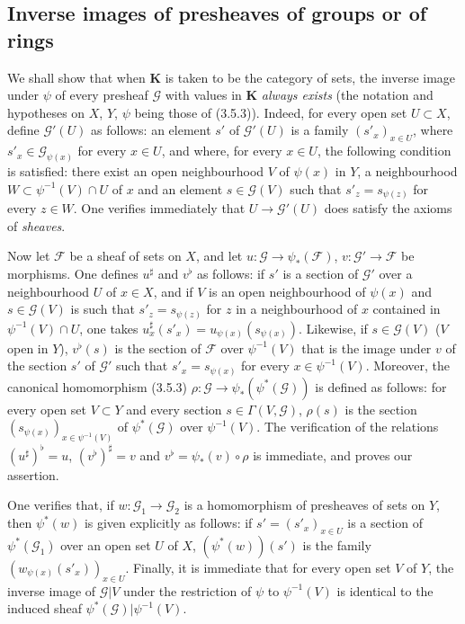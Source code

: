 \subsection{Inverse images of presheaves of groups or of rings}


\begin{env}[3.7.1]
\label{0.3.7.1}
We shall show that when $\boldsymbol{K}$ is taken to be the category of
sets, the inverse image under $\psi$ of every presheaf $\mathcal{G}$ with
values in $\boldsymbol{K}$ \emph{always exists} (the notation and hypotheses
on $X$, $Y$, $\psi$ being those of (3.5.3)). Indeed, for every open set
$U\subset X$, define $\mathcal{G}'(U)$ as follows: an element $s'$ of
$\mathcal{G}'(U)$ is a family $(s'_x)_{x\in U}$, where
$s'_x\in\mathcal{G}_{\psi(x)}$ for every $x\in U$, and where, for every $x\in U$,
the following condition is satisfied: there exist an open neighbourhood $V$ of
$\psi(x)$ in $Y$, a neighbourhood $W\subset\psi^{-1}(V)\cap U$ of $x$ and an
element $s\in\mathcal{G}(V)$ such that $s'_z=s_{\psi(z)}$ for every $z\in W$.
One verifies immediately that $U\to\mathcal{G}'(U)$ does satisfy the
axioms of \emph{sheaves}.

Now let $\mathcal{F}$ be a sheaf of sets on $X$, and let
$u:\mathcal{G}\to\psi_*(\mathcal{F})$,
$v:\mathcal{G}'\to\mathcal{F}$ be morphisms. One defines $u^\sharp$ and $v^\flat$
as follows: if $s'$ is a section of $\mathcal{G}'$ over
a neighbourhood $U$ of $x\in X$, and if $V$ is an open neighbourhood of $\psi(x)$
and $s\in\mathcal{G}(V)$ is such that $s'_z=s_{\psi(z)}$ for $z$ in a
neighbourhood of $x$ contained in $\psi^{-1}(V)\cap U$, one takes
$u_x^\sharp(s'_x)=u_{\psi(x)}(s_{\psi(x)})$. Likewise, if
$s\in\mathcal{G}(V)$ ($V$ open in $Y$), $v^\flat(s)$ is the section of
$\mathcal{F}$ over $\psi^{-1}(V)$ that is the image under $v$ of the section $s'$ of
$\mathcal{G}'$ such that $s'_x=s_{\psi(x)}$ for every
$x\in\psi^{-1}(V)$. Moreover, the canonical homomorphism (3.5.3)
$\rho:\mathcal{G}\to\psi_*(\psi^*(\mathcal{G}))$ is defined as
follows: for every open set $V\subset Y$ and every section
$s\in\Gamma(V,\mathcal{G})$, $\rho(s)$ is the section
$(s_{\psi(x)})_{x\in\psi^{-1}(V)}$ of $\psi^*(\mathcal{G})$ over
$\psi^{-1}(V)$. The verification of the relations
$(u^\sharp)^\flat=u$, $(v^\flat)^\sharp=v$ and
$v^\flat=\psi_*(v)\circ\rho$ is immediate, and proves our assertion.

One verifies that, if $w:\mathcal{G}_1\to\mathcal{G}_2$ is a homomorphism of
presheaves of sets on $Y$, then $\psi^*(w)$ is given explicitly as
follows: if $s'=(s'_x)_{x\in U}$ is a section of
$\psi^*(\mathcal{G}_1)$ over an open set $U$ of $X$,
$(\psi^*(w))(s')$ is the family
$(w_{\psi(x)}(s'_x))_{x\in U}$. Finally, it is immediate that for every open set
$V$ of $Y$, the inverse image of $\mathcal{G}|V$ under the restriction of
$\psi$ to $\psi^{-1}(V)$ is identical to the induced sheaf
$\psi^*(\mathcal{G})|\psi^{-1}(V)$.


\end{env}
